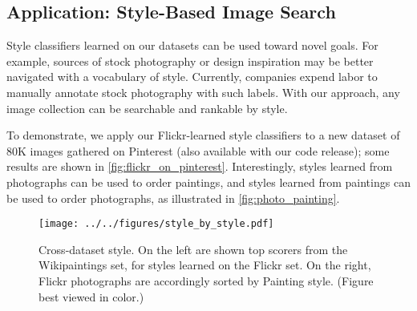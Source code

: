 \subsection{Application: Style-Based Image Search}



Style classifiers learned on our datasets can be used toward novel goals.
For example, sources of stock photography or design inspiration may be better navigated with a vocabulary of style.
Currently, companies expend labor to manually annotate stock photography with such labels.
With our approach, any image collection can be searchable and rankable by style.

To demonstrate, we apply our Flickr-learned style classifiers to a new dataset of 80K images gathered on Pinterest (also available with our code release); some results are shown in \autoref{fig:flickr_on_pinterest}.
Interestingly, styles learned from photographs can be used to order paintings, and styles learned from paintings can be used to order photographs, as illustrated in \autoref{fig:photo_painting}.

\begin{figure*}[ht]
\centering
\texttt{[image: ../../figures/style\_by\_style.pdf]}
\vspace{-1ex}
\caption{
    Cross-dataset style.
    On the left are shown top scorers from the Wikipaintings set, for styles learned on the Flickr set.
    On the right, Flickr photographs are accordingly sorted by Painting style.
    (Figure best viewed in color.)
}
\label{fig:photo_painting}
\end{figure*}


